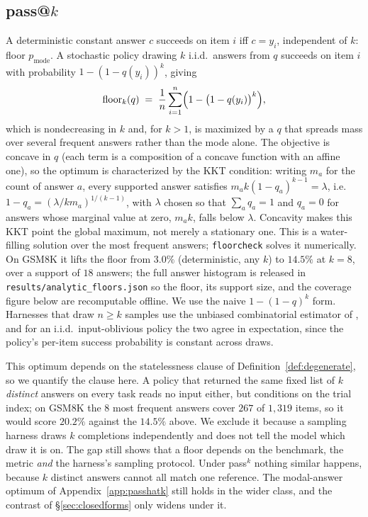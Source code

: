 \documentclass{article}
\theoremstyle{plain}
\theoremstyle{definition}
\newcommand{\floorcheck}{\texttt{floorcheck}}
\begin{document}
\subsection{\texorpdfstring{pass@$k$}{pass@k}}
A deterministic constant answer $c$ succeeds on item $i$ iff $c = y_i$, independent of $k$: floor $p_{\mathrm{mode}}$. A stochastic policy drawing $k$ i.i.d.\ answers from $q$ succeeds on item $i$ with probability $1 - (1-q(y_i))^k$, giving
\begin{equation}
  \mathrm{floor}_k(q) \;=\; \frac{1}{n}\sum_{i=1}^{n}\Bigl(1 - \bigl(1 - q(y_i)\bigr)^{k}\Bigr),
\end{equation}
which is nondecreasing in $k$ and, for $k > 1$, is maximized by a $q$ that spreads mass over several frequent answers rather than the mode alone. The objective is concave in $q$ (each term is a composition of a concave function with an affine one), so the optimum is characterized by the KKT condition: writing $m_a$ for the count of answer $a$, every supported answer satisfies $m_a k (1-q_a)^{k-1} = \lambda$, i.e.\ $1 - q_a = (\lambda / k m_a)^{1/(k-1)}$, with $\lambda$ chosen so that $\sum_a q_a = 1$ and $q_a = 0$ for answers whose marginal value at zero, $m_a k$, falls below $\lambda$. Concavity makes this KKT point the global maximum, not merely a stationary one. This is a water-filling solution over the most frequent answers; \floorcheck{} solves it numerically. On GSM8K it lifts the floor from $3.0\%$ (deterministic, any $k$) to $14.5\%$ at $k=8$, over a support of $18$ answers; the full answer histogram is released in \texttt{results/analytic\_floors.json} so the floor, its support size, and the coverage figure below are recomputable offline. We use the naive $1 - (1-q)^k$ form. Harnesses that draw $n \ge k$ samples use the unbiased combinatorial estimator of \citet{chen2021codex}, and for an i.i.d.\ input-oblivious policy the two agree in expectation, since the policy's per-item success probability is constant across draws.

This optimum depends on the statelessness clause of Definition~\ref{def:degenerate}, so we quantify the clause here. A policy that returned the same fixed list of $k$ \emph{distinct} answers on every task reads no input either, but conditions on the trial index; on GSM8K the $8$ most frequent answers cover $267$ of $1{,}319$ items, so it would score $20.2\%$ against the $14.5\%$ above. We exclude it because a sampling harness draws $k$ completions independently and does not tell the model which draw it is on. The gap still shows that a floor depends on the benchmark, the metric \emph{and} the harness's sampling protocol. Under pass$^{k}$ nothing similar happens, because $k$ distinct answers cannot all match one reference. The modal-answer optimum of Appendix~\ref{app:passhatk} still holds in the wider class, and the contrast of \S\ref{sec:closedforms} only widens under it.
\end{document}
